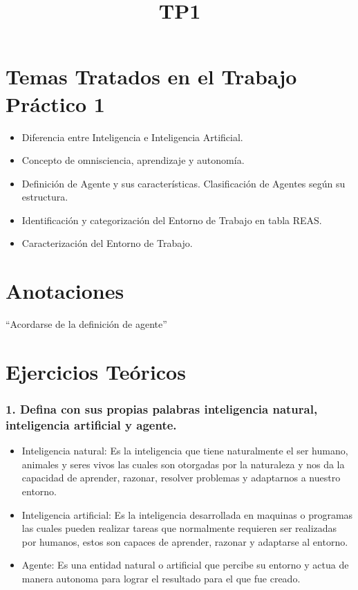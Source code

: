\documentclass[11pt]{article}
\title{TP1}
\begin{document}
    
    \maketitle
    
    

    
    \section{Temas Tratados en el Trabajo Práctico
1}\label{temas-tratados-en-el-trabajo-pruxe1ctico-1}

\begin{itemize}
\item
  Diferencia entre Inteligencia e Inteligencia Artificial.
\item
  Concepto de omnisciencia, aprendizaje y autonomía.
\item
  Definición de Agente y sus características. Clasificación de Agentes
  según su estructura.
\item
  Identificación y categorización del Entorno de Trabajo en tabla REAS.
\item
  Caracterización del Entorno de Trabajo.
\end{itemize}

\section{Anotaciones}\label{anotaciones}

``Acordarse de la definición de agente''

    \section{Ejercicios Teóricos}\label{ejercicios-teuxf3ricos}

\subsubsection{1. Defina con sus propias palabras inteligencia natural,
inteligencia artificial y
agente.}\label{defina-con-sus-propias-palabras-inteligencia-natural-inteligencia-artificial-y-agente.}

    \begin{itemize}
\item
  Inteligencia natural: Es la inteligencia que tiene naturalmente el ser
  humano, animales y seres vivos las cuales son otorgadas por la
  naturaleza y nos da la capacidad de aprender, razonar, resolver
  problemas y adaptarnos a nuestro entorno.
\item
  Inteligencia artificial: Es la inteligencia desarrollada en maquinas o
  programas las cuales pueden realizar tareas que normalmente requieren
  ser realizadas por humanos, estos son capaces de aprender, razonar y
  adaptarse al entorno.
\item
  Agente: Es una entidad natural o artificial que percibe su entorno y
  actua de manera autonoma para lograr el resultado para el que fue
  creado.
\end{itemize}
\end{document}
